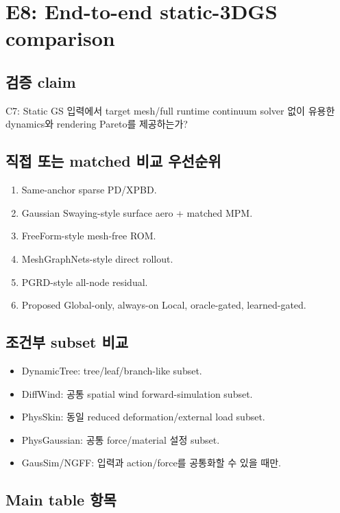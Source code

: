 \documentclass[11pt,a4paper]{article}
\begin{document}
\section{E8: End-to-end static-3DGS comparison}

\subsection*{검증 claim}

C7: Static GS 입력에서 target mesh/full runtime continuum solver 없이
유용한 dynamics와 rendering Pareto를 제공하는가?

\subsection*{직접 또는 matched 비교 우선순위}

\begin{enumerate}[leftmargin=1.7em]
  \item Same-anchor sparse PD/XPBD.
  \item Gaussian Swaying-style surface aero + matched MPM.
  \item FreeForm-style mesh-free ROM.
  \item MeshGraphNets-style direct rollout.
  \item PGRD-style all-node residual.
  \item Proposed Global-only, always-on Local, oracle-gated, learned-gated.
\end{enumerate}

\subsection*{조건부 subset 비교}

\begin{itemize}[leftmargin=1.5em]
  \item DynamicTree: tree/leaf/branch-like subset.
  \item DiffWind: 공통 spatial wind forward-simulation subset.
  \item PhysSkin: 동일 reduced deformation/external load subset.
  \item PhysGaussian: 공통 force/material 설정 subset.
  \item GausSim/NGFF: 입력과 action/force를 공통화할 수 있을 때만.
\end{itemize}

\subsection*{Main table 항목}
\end{document}
